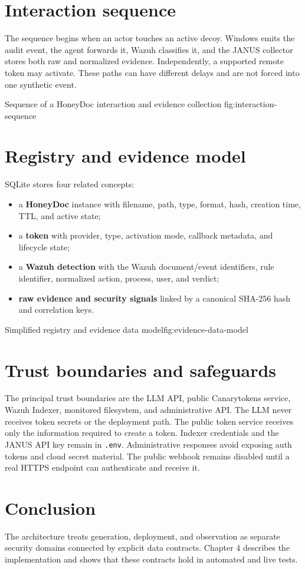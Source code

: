 \section{Interaction sequence}

The sequence begins when an actor touches an active decoy. Windows emits the
audit event, the agent forwards it, Wazuh classifies it, and the JANUS collector
stores both raw and normalized evidence. Independently, a supported remote
token may activate. These paths can have different delays and are not forced
into one synthetic event.

{Sequence of a HoneyDoc interaction and evidence collection}
{fig:interaction-sequence}

\section{Registry and evidence model}

SQLite stores four related concepts:

\begin{itemize}
  \item a \textbf{HoneyDoc} instance with filename, path, type, format, hash,
  creation time, TTL, and active state;
  \item a \textbf{token} with provider, type, activation mode, callback metadata,
  and lifecycle state;
  \item a \textbf{Wazuh detection} with the Wazuh document/event identifiers,
  rule identifier, normalized action, process, user, and verdict;
  \item \textbf{raw evidence and security signals} linked by a canonical
  SHA-256 hash and correlation keys.
\end{itemize}

{Simplified registry and evidence data model}{fig:evidence-data-model}

\section{Trust boundaries and safeguards}

The principal trust boundaries are the LLM API, public Canarytokens service,
Wazuh Indexer, monitored filesystem, and administrative API. The LLM never
receives token secrets or the deployment path. The public token service receives
only the information required to create a token. Indexer credentials and the
JANUS API key remain in \texttt{.env}. Administrative responses avoid exposing
auth tokens and cloud secret material. The public webhook remains disabled
until a real HTTPS endpoint can authenticate and receive it.

\section{Conclusion}

The architecture treats generation, deployment, and observation as separate
security domains connected by explicit data contracts. Chapter 4 describes the
implementation and shows that these contracts hold in automated and live tests.

